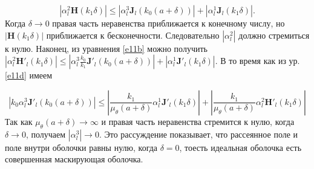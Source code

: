 \documentclass[a4paper, 12pt]{article}
\begin{document}

\begin{equation}\label{e12}
	\left| \alpha_l^2\mathbf{H}(k_1 \delta) \right| \le \left| \alpha_l^3 \mathbf{J}_l(k_0(a+\delta)) \right| + 
	\left| \alpha_l^1 \mathbf{J}_l(k_1 \delta) \right|. 
\end{equation}
Когда $\delta \to 0$ правая часть неравенства приближается к конечному числу, но $\left| \mathbf{H}(k_1 \delta) \right|$ 
приближается к бесконечности. Следовательно $\left| \alpha_l^2 \right|$ должно стремиться к нулю. Наконец, из уравнения 
\eqref{e11b} можно получить $\left| \alpha_l^2 \mathbf{H'}_l(k_1 \delta) \right| \le \left| \alpha_l^3 \frac{k_0}{k_1}
\mathbf{J'}_l(k_0(a+\delta))\right|+\left| \alpha_l^1\mathbf{J'}_l(k_1 \delta)\right|$. В то время как из ур. \eqref{e11d} 
имеем

\begin{equation}\label{e13}
	\left| k_0 \alpha_l^3 \mathbf{J'}_l(k_0(a+\delta))\right| \le
	\left| \frac{k_1}{\mu_\theta(a+\delta)}\alpha_l^1 \mathbf{J'}_l(k_1 \delta) \right| + 
	\left| \frac{k_1}{\mu_\theta(a+\delta)}\alpha_l^2 \mathbf{H'}_l(k_1 \delta) \right|
\end{equation}
Так как $\mu_\theta(a+\delta) \to \infty$ и правая часть неравенства стремится к нулю, когда $\delta \to 0$, получаем
$|\alpha_l^3| \to 0$. Это рассуждение показывает, что рассеянное поле и поле внутри оболочки равны нулю, когда $\delta=0$,
тоесть идеальная оболочка есть совершенная маскирующая оболочка.
\end{document}
